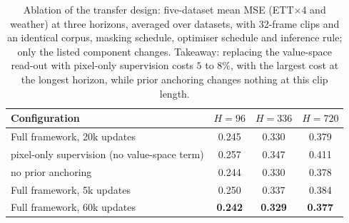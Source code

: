 \begin{table}[t]
\caption{Ablation of the transfer design: five-dataset mean MSE (ETT$\times$4 and weather) at three
horizons, averaged over datasets, with 32-frame clips and an identical corpus, masking schedule,
optimiser schedule and inference rule; only the listed component changes. Takeaway: replacing the
value-space read-out with pixel-only supervision costs $5$ to $8\%$, with the largest cost at the
longest horizon, while prior anchoring changes nothing at this clip length.}
\label{tab:ablation}
\begin{center}
\setlength{\tabcolsep}{6pt}
\footnotesize
\begin{tabular}{lccc}
\toprule
Configuration & $H{=}96$ & $H{=}336$ & $H{=}720$ \\
\midrule
Full framework, 20k updates & 0.245 & 0.330 & 0.379 \\
\quad pixel-only supervision (no value-space term) & 0.257 & 0.347 & 0.411 \\
\quad no prior anchoring & 0.244 & 0.330 & 0.378 \\
\midrule
Full framework, 5k updates & 0.250 & 0.337 & 0.384 \\
Full framework, 60k updates & \textbf{0.242} & \textbf{0.329} & \textbf{0.377} \\
\bottomrule
\end{tabular}
\end{center}
\end{table}
